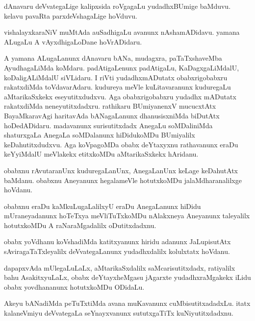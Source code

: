 \documentclass{article}
\begin{document}
\begin{mn}%
dAnavaru deVvategaLige kalipxsida roVgagaLu yudadhxBUmige baMduvu. kelavu pavaRta 
parxdeVshagaLige hoVduvu.
\end{mn}

\begin{mn}%
vishalayxkaraNiV muMtAda auSadhigaLu avanunx nAshamADidavu. yamana ALugaLu A vAyxdhigaLoDane 
hoVrADidaru.
\end{mn}

\begin{mn}%
A yamana ALugaLanunx dAnavaru bANa, mudagxra, paTaTxshaveMba AyudhagaLiMda koMdaru. 
padAtigaLenunx padAtigaLu, KaDagxgaLiMdalU, koDaligALiMdalU siVLidaru. I riVti 
yudadhxmADutatx obabxrigobabxru rakatxdiMda toVdavarAdaru. kudureya meVle kuLitavaranunx 
kuduregaLu aMtarikaSxkekx eseyutitxdudxvu. Aga obabxrigobabxru yudadhx mADutatx rakatxdiMda 
neneyutitxdadxru. rathikaru BUmiyanenxV mucucxtAtx BayaMkaravAgi haritavAda bANagaLanunx 
dhanusisxniMda biDutAtx hoDedADidaru. madavanunx surisutitxdadx AnegaLu soMDaliniMda 
shaturxgaLa AnegaLa soMDalanunx hiDidukoMDu BUmiyalilx keDahutitxdudxvu. Aga koVpagoMDa 
obabx deYtaxyxnu rathavanunx eraDu keYyiMdalU meVlakekx etitxkoMDu aMtarikaSxkekx hAridanu.
\end{mn}

\begin{mn}%
obabxnu rAvutaranUnx kuduregaLanUnx, AnegaLanUnx keLage keDahutAtx baMdanu. obabxnu 
Aneyanunx hegalameVle hotutxkoMDu jalaMdharanalilxge hoVdanu.
\end{mn}

\begin{mn}%
obabxnu eraDu kaMkuLugaLalilxyU eraDu AnegaLanunx hiDidu mUraneyadanunx hoTeTxya 
meVliTuTxkoMDu nAlakxneya Aneyanunx taleyalilx hotutxkoMDu A raNaraMgadalilx oDutitxdadxnu.
\end{mn}

\begin{mn}%
obabx yoVdhanu koVshadiMda katitxyanunx hiridu adanunx JaLupisutAtx sAviragaTaTxleyalilx 
deVvategaLanunx yudadhxdalilx kolulxtatx hoVdanu.
\end{mn}

\begin{mn}%
dapapxvAda mUlegaLuLaLx, aMtarikaSxdalilx saMcarisutitxdadx, ratiyalilx bahu AsakitxyuLaLx, 
obabx deYtayxheMgasu jAgarxte yudadhxraMgakekx iLidu obabx yovdhananunx hotutxkoMDu ODidaLu.
\end{mn}

\begin{mn}%
Akeyu bANadiMda peTuTxtiMda avana muKavanunx cuMbisutitxadadxLu. itatx kalaneVmiyu 
deVvategaLa seYnayxvanunx sututxgaTiTx kuNiyutitxdadxnu.
\end{mn}
\end{document}
